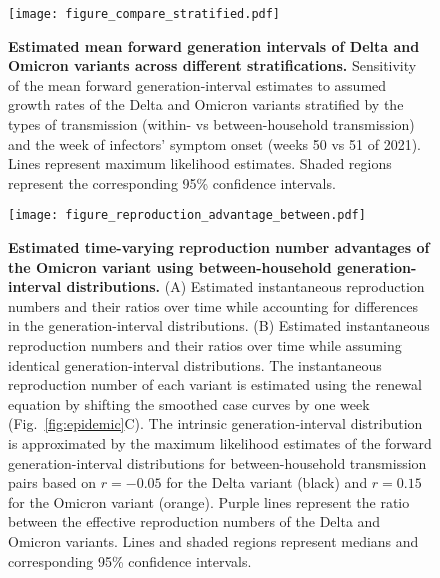 \documentclass[12pt]{article}
\newcommand{\fref}[1]{Fig.~\ref{fig:#1}}
\begin{document}
\pagebreak

\begin{figure}[!th]
\texttt{[image: figure\_compare\_stratified.pdf]}
\caption{
\textbf{Estimated mean forward generation intervals of Delta and Omicron variants across different stratifications.}
Sensitivity of the mean forward generation-interval estimates to assumed growth rates of the Delta and Omicron variants stratified by the types of transmission (within- vs between-household transmission) and the week of infectors' symptom onset (weeks 50 vs 51 of 2021).
Lines represent maximum likelihood estimates.
Shaded regions represent the corresponding 95\% confidence intervals.
}
\end{figure}


\pagebreak

\begin{figure}[!th]
\texttt{[image: figure\_reproduction\_advantage\_between.pdf]}
\caption{
\textbf{Estimated time-varying reproduction number advantages of the Omicron variant using between-household generation-interval distributions.}
(A) Estimated instantaneous reproduction numbers and their ratios over time while accounting for differences in the generation-interval distributions.
(B) Estimated instantaneous reproduction numbers and their ratios over time while assuming identical generation-interval distributions.
The instantaneous reproduction number of each variant is estimated using the renewal equation by shifting the smoothed case curves by one week (\fref{epidemic}C).
The intrinsic generation-interval distribution is approximated by the maximum likelihood estimates of the forward generation-interval distributions for between-household transmission pairs based on $r=-0.05$ for the Delta variant (black) and $r=0.15$ for the Omicron variant (orange).
Purple lines represent the ratio between the effective reproduction numbers of the Delta and Omicron variants.
Lines and shaded regions represent medians and corresponding 95\% confidence intervals.
}
\end{figure}

\pagebreak


\end{document}
